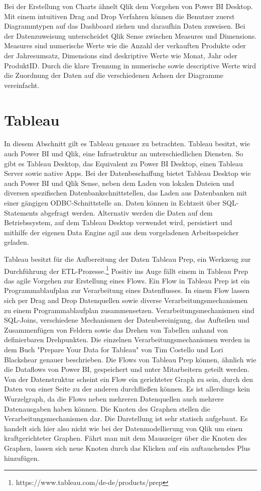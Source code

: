 Bei der Erstellung von Charts ähnelt Qlik dem Vorgehen von Power BI Desktop. Mit einem intuitiven
Drag and Drop Verfahren können die Benutzer zuerst Diagrammtypen auf das Dashboard ziehen und
daraufhin Daten zuweisen. Bei der Datenzuweisung unterscheidet Qlik Sense zwischen Measures und
Dimensions. Measures sind numerische Werte wie die Anzahl der verkauften Produkte oder der Jahresumsatz,
Dimensions sind deskriptive Werte wie Monat, Jahr oder ProduktID.\cite{TutorialsSpotMeasuresDimensions}
Durch die klare Trennung in numerische sowie descriptive Werte wird die Zuordnung der Daten
auf die verschiedenen Achsen der Diagramme vereinfacht.

\section{Tableau}
\label{sec:tableau}
In diesem Abschnitt gilt es Tableau genauer zu betrachten. Tableau besitzt, wie auch Power BI und Qlik,
eine Infrastruktur an unterschiedlichen Diensten. So gibt es Tableau Desktop, das Equivalent zu Power BI
Desktop, einen Tableau Server sowie native Apps. Bei der Datenbeschaffung bietet Tableau Desktop wie auch
Power BI und Qlik Sense, neben dem Laden von lokalen Dateien und diversen spezifischen Datenbankschnittstellen,
das Laden aus Datenbanken mit einer gängigen ODBC-Schnittstelle an. Daten können in Echtzeit
über SQL-Statements abgefragt werden. Alternativ werden die Daten auf dem Betriebssystem, auf dem
Tableau Desktop verwendet wird, persistiert und mithilfe der eigenen Data Engine agil aus dem
vorgeladenen Arbeitsspeicher geladen.\cite[S. 50]{ProTableauBook}

Tableau besitzt für die Aufbereitung der Daten Tableau Prep, ein Werkzeug zur Durchführung der
ETL-Prozesse.\footnote{https://www.tableau.com/de-de/products/prep} Positiv ins Auge fällt einem
in Tableau Prep das agile Vorgehen zur Erstellung eines Flows. Ein Flow in Tableau Prep ist ein Programmablaufplan
zur Verarbeitung eines Datenflusses. In einem Flow lassen sich per Drag and Drop Datenquellen sowie diverse Verarbeitungsmechanismen zu einem Programmablaufplan
zusammensetzen. Verarbeitungsmechanismen sind SQL-Joins, verschiedene Mechanismen der Datenbereinigung,
das Aufteilen und Zusammenfügen von Feldern sowie das Drehen von Tabellen anhand von definierbaren Drehpunkten.
Die einzelnen Verarbeitungsmechanismen werden in dem Buch "Prepare Your Data for Tableau" von Tim Costello und
Lori Blackshear genauer beschrieben.\cite{PrepareYourDataForTableauBook} Die Flows von Tableau Prep können,
ähnlich wie die Dataflows von Power BI, gespeichert und unter Mitarbeitern geteilt werden. Von der Datenstruktur
scheint ein Flow ein gerichteter Graph zu sein, durch den Daten von einer Seite zu der anderen durchfließen
können. Es ist allerdings kein Wurzelgraph, da die Flows neben mehreren Datenquellen auch mehrere Datenausgaben
haben können. Die Knoten des Graphen stellen die Verarbeitungsmechanismen dar. Die Darstellung ist sehr statisch
aufgebaut. Es handelt sich hier also nicht wie bei der Datenmodellierung von Qlik um einen kraftgerichteter Graphen.
Fährt man mit dem Mauszeiger über die Knoten des Graphen, lassen sich neue Knoten durch das Klicken auf ein
auftauchendes Plus hinzufügen.

